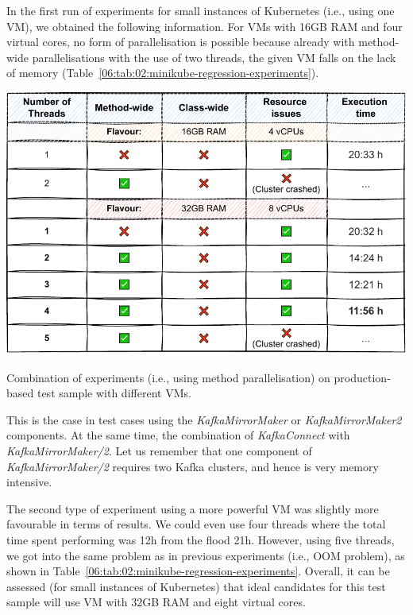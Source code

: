 In the first run of experiments for small instances of Kubernetes (i.e., using one VM), we obtained the following information.
For VMs with 16GB RAM and four virtual cores, no form of parallelisation is possible because already with method-wide parallelisations
with the use of two threads, the given VM falls on the lack of memory (Table~\ref{06:tab:02:minikube-regression-experiments}).
\begin{table}[ht!]
    \centering
    \includegraphics[scale=0.8]{obrazky-figures/08-experiments/regression/06-minikube-regression}
    \caption{Combination of experiments (i.e., using method parallelisation) on production-based test sample with different VMs.}
    \label{06:tab:02:minikube-regression-experiments}
\end{table}
This is the case in test cases using the \emph{KafkaMirrorMaker} or \emph{KafkaMirrorMaker2} components.
At the same time, the combination of \emph{KafkaConnect} with \emph{KafkaMirrorMaker/2}.
Let us remember that one component of \emph {KafkaMirrorMaker/2} requires two Kafka clusters, and hence
is very memory intensive.

The second type of experiment using a more powerful VM was slightly more favourable in terms of results.
We could even use four threads where the total time spent performing was 12h from the flood 21h.
However, using five threads, we got into the same problem as in previous experiments (i.e., OOM problem), as
shown in Table~\ref{06:tab:02:minikube-regression-experiments}.
Overall, it can be assessed (for small instances of Kubernetes) that ideal candidates for this test sample
will use VM with 32GB RAM and eight virtual cores.

